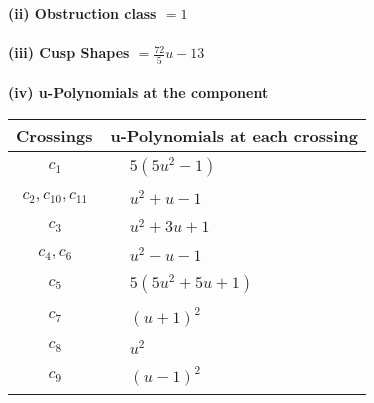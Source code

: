\documentclass[1p]{elsarticle_modified}
\theoremstyle{definition}
\begin{document}
\flushleft \textbf{(ii) Obstruction class $= 1$}\\~\\
\flushleft \textbf{(iii) Cusp Shapes $= \frac{72}{5} u-13$}\\~\\
\newpage\renewcommand{\arraystretch}{1}
\flushleft \textbf{(iv) u-Polynomials at the component}\newline \\
\begin{tabular}{m{50pt}|m{274pt}}
Crossings & \hspace{64pt}u-Polynomials at each crossing \\
\hline $$\begin{aligned}c_{1}\end{aligned}$$&$\begin{aligned}
&5(5 u^2-1)
\end{aligned}$\\
\hline $$\begin{aligned}c_{2},c_{10},c_{11}\end{aligned}$$&$\begin{aligned}
&u^2+u-1
\end{aligned}$\\
\hline $$\begin{aligned}c_{3}\end{aligned}$$&$\begin{aligned}
&u^2+3 u+1
\end{aligned}$\\
\hline $$\begin{aligned}c_{4},c_{6}\end{aligned}$$&$\begin{aligned}
&u^2- u-1
\end{aligned}$\\
\hline $$\begin{aligned}c_{5}\end{aligned}$$&$\begin{aligned}
&5(5 u^2+5 u+1)
\end{aligned}$\\
\hline $$\begin{aligned}c_{7}\end{aligned}$$&$\begin{aligned}
&(u+1)^2
\end{aligned}$\\
\hline $$\begin{aligned}c_{8}\end{aligned}$$&$\begin{aligned}
&u^2
\end{aligned}$\\
\hline $$\begin{aligned}c_{9}\end{aligned}$$&$\begin{aligned}
&(u-1)^2
\end{aligned}$\\
\hline
\end{tabular}\\~\\
\end{document}
